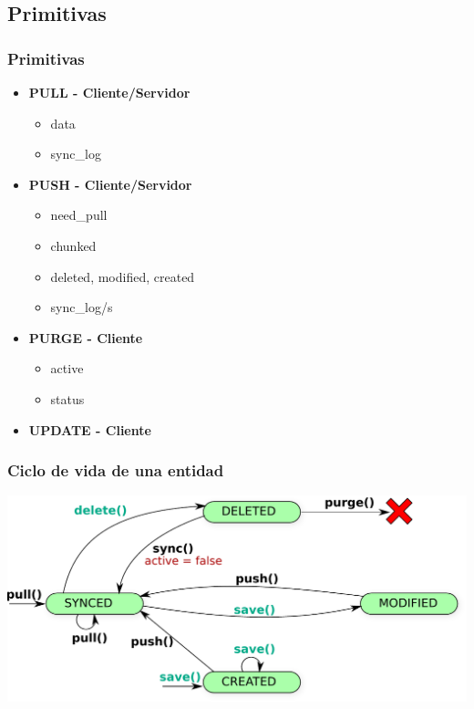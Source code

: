 \documentclass{beamer}
\begin{document}
\subsection{Primitivas}
\begin{frame}
    \frametitle{Primitivas}
    	\begin{itemize}
            \item{\bf PULL - Cliente/Servidor}
            	\begin{itemize}
                	\item{data}
                	\item{sync\_log}
          		\end{itemize}
            \item{\bf PUSH - Cliente/Servidor}
            	\begin{itemize}
                	\item{need\_pull}
                	\item{chunked}
                	\item{deleted, modified, created}
                	\item{sync\_log/s}
          		\end{itemize}
            \item{\bf PURGE - Cliente}
            	\begin{itemize}
                	\item{active}
                	\item{status}
                \end{itemize}
            \item{\bf UPDATE - Cliente} 
        \end{itemize}
\end{frame}

\begin{frame}
    \frametitle{Ciclo de vida de una entidad}
    \includegraphics[scale=0.55]{esquema_sync_client.pdf}
\end{frame}
\end{document}
